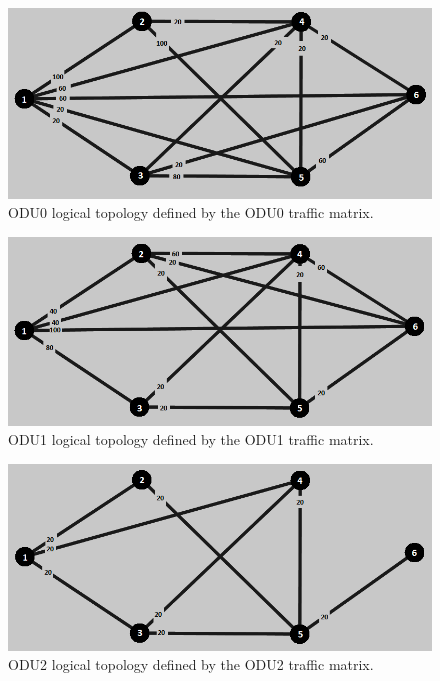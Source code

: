 \begin{figure}[H]
\centering
\includegraphics[width=13cm]{sdf/heuristic/opaque_protection/high/logical_topology_odu0_high}
\caption{ODU0 logical topology defined by the ODU0 traffic matrix.}
\label{logical_ODU0_protec_ref_high_heuristic}
\end{figure}

\begin{figure}[H]
\centering
\includegraphics[width=13cm]{sdf/heuristic/opaque_protection/high/logical_topology_odu1_high}
\caption{ODU1 logical topology defined by the ODU1 traffic matrix.}
\label{logical_ODU1_protec_ref_high_heuristic}
\end{figure}

\begin{figure}[H]
\centering
\includegraphics[width=13cm]{sdf/heuristic/opaque_protection/high/logical_topology_odu2_high}
\caption{ODU2 logical topology defined by the ODU2 traffic matrix.}
\label{logical_ODU2_protec_ref_high_heuristic}
\end{figure}


